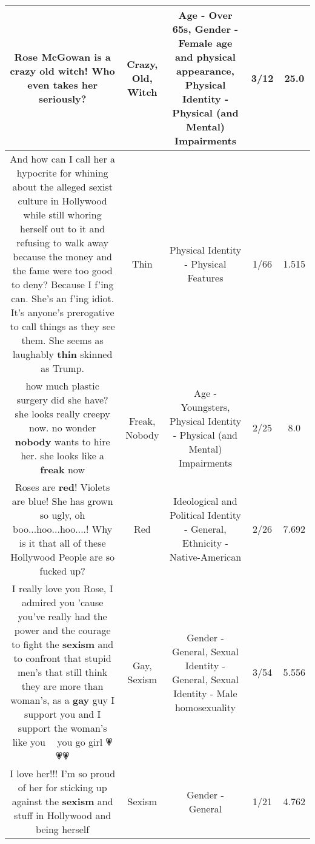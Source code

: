 \documentclass[11pt]{article}
\newlength\mylength
\begin{document}
\begin{center}
\begin{longtable}{|C{.65\mylength}|C{.30\mylength}|C{.12\mylength}|C{.12\mylength}|C{.12\mylength}|}
  \small Rose McGowan is a \textbf{crazy} \textbf{old} \textbf{witch}! Who even takes her seriously?\normalsize   & Crazy, Old, Witch & Age - Over 65s, Gender - Female age and physical appearance, Physical Identity - Physical (and Mental) Impairments & 3/12 & 25.0 \\  \hline
  \small And how can I call her a hypocrite for whining about the alleged sexist culture in Hollywood while still whoring herself out to it and refusing to walk away because the money and the fame were too good to deny? Because I f'ing can. She's an f'ing idiot. It's anyone's prerogative to call things as they see them. She seems as laughably \textbf{thin} skinned as Trump.\normalsize   & Thin & Physical Identity - Physical Features & 1/66 & 1.515 \\  \hline
  \small how much plastic surgery did she have? she looks really creepy now.  no wonder \textbf{nobody} wants to hire her. she looks like a \textbf{freak} now\normalsize   & Freak, Nobody & Age - Youngsters, Physical Identity - Physical (and Mental) Impairments & 2/25 & 8.0 \\  \hline
  \small Roses are \textbf{r\textbf{ed}}!   Violets are blue!   She has grown so ugly,  oh boo...hoo...hoo....!    Why is it that all of these Hollywood People are so fucked up?\normalsize   & Red &  Ideological and Political Identity - General, Ethnicity - Native-American & 2/26 & 7.692 \\  \hline
  \small I really love you Rose, I admired you 'cause you've really had the power and the courage to fight the \textbf{sexism} and to confront that stupid men's that still think they are more than woman's, as a \textbf{g\textbf{ay}} guy I support you and I support the woman's like you  🙂🙂  you go girl 💗💗💗\normalsize   & Gay, Sexism & Gender - General, Sexual Identity - General, Sexual Identity - Male homosexuality & 3/54 & 5.556 \\  \hline
  \small I love her!!! I'm so proud of her for sticking up against the \textbf{sexism} and stuff in Hollywood and being herself\normalsize   & Sexism & Gender - General & 1/21 & 4.762 \\  \hline

\end{longtable}
\end{center}
\end{document}
